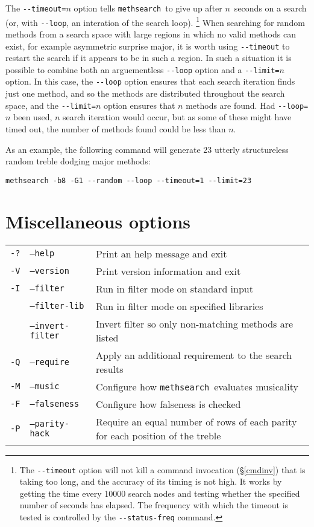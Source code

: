 \documentclass[a4paper,11pt,oneside]{book}
\makeatletter
\newcommand{\loid}[1]{\index{#1@{\hspace*{-\loptwidth}\texttt{--#1}}|ulink}}
\def\methsearch{\texttt{meth\-search}}
\newcommand{\sref}[1]{\hyperref[#1]{\S\ref{#1}}}
\makeatother
\begin{document}
The \verb+--timeout=+$n$ option\loid{timeout} tells \methsearch\ to give up
after $n$~seconds on a search (or, with \verb+--loop+, an interation of the 
search loop).%
\footnote{The \verb+--timeout+ option will not kill a command invocation
(\sref{cmdinv}) that is taking too long, and the accuracy of its timing
is not high.  It works by getting the time every 10000 search nodes and
testing whether the specified number of seconds has elapsed.  The frequency
with which the timeout is tested is controlled by the \verb+--status-freq+
command.}
When searching for random methods from a search space with large regions
in which no valid methods can exist, for example asymmetric surprise major,
it is worth using \verb+--timeout+ to restart the search if it 
appears to be in such a region.  In such a situation it is possible to
combine both an arguementless \verb+--loop+ option and a \verb+--limit=+$n$
option.  In this case, the \verb+--loop+ option ensures that each search
iteration finds just one method, and so the methods are distributed throughout
the search space, and the \verb+--limit=+$n$ option ensures that $n$ methods
are found.  Had \verb+--loop=+$n$ been used, $n$ search iteration would occur,
but as some of these might have timed out, the number of methods found
could be less than $n$.

As an example, the following command will generate 23 utterly structureless 
random treble dodging major methods:%
\begin{Verbatim}[commandchars=\%~~]
methsearch -b8 -G1 --random --loop --timeout=1 --limit=23
\end{Verbatim}


\section{Miscellaneous options}\label{misc_opt}

\begin{tabularx}{\textwidth}{llX}
\texttt{-?}&\texttt{--help}&Print an help message and exit\\
\texttt{-V}&\texttt{--version}&Print version information and exit\\
\texttt{-I}&\texttt{--filter}&Run in filter mode on standard input\\
&\texttt{--filter-lib}&Run in filter mode on specified libraries\\
&\texttt{--invert-filter}
                &Invert filter so only non-matching methods are listed\\
\texttt{-Q}&\texttt{--require} 
                &Apply an additional requirement to the search results\\
\texttt{-M}&\texttt{--music}&Configure how \methsearch\ evaluates musicality\\
\texttt{-F}&\texttt{--falseness}&Configure how falseness is checked\\
\texttt{-P}&\texttt{--parity-hack}&Require an equal number of rows of each 
  parity for each position of the treble\\
\end{tabularx}
\end{document}

